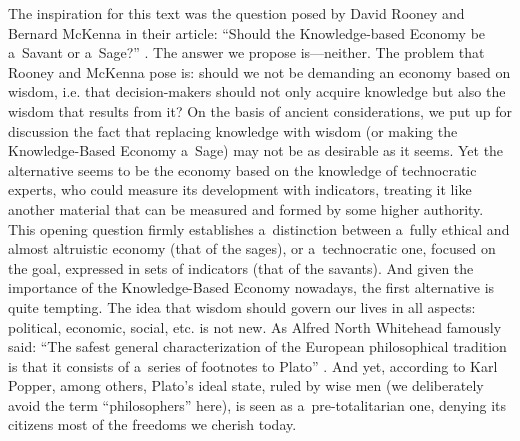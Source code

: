 The inspiration for this text was the question posed by David Rooney and Bernard McKenna in their article: ``Should the Knowledge-based Economy be a~Savant or a~Sage?'' 
\parencite*[][]{}. %
 The answer we propose is---neither. The problem that Rooney and McKenna pose is: should we not be demanding an economy based on wisdom, i.e. that decision-makers should not only acquire knowledge but also the wisdom that results from it? On the basis of ancient considerations, we put up for discussion the fact that replacing knowledge with wisdom (or making the Knowledge-Based Economy a~Sage) may not be as desirable as it seems. Yet the alternative seems to be the economy based on the knowledge of technocratic experts, who could measure its development with indicators, treating it like another material that can be measured and formed by some higher authority. This opening question firmly establishes a~distinction between a~fully ethical and almost altruistic economy (that of the sages), or a~technocratic one, focused on the goal, expressed in sets of indicators (that of the savants). And given the importance of the Knowledge-Based Economy nowadays, the first alternative is quite tempting. The idea that wisdom should govern our lives in all aspects: political, economic, social, etc. is not new. As Alfred North Whitehead famously said: ``The safest general characterization of the European philosophical tradition is that it consists of a~series of footnotes to Plato'' 
\parencite[][p.39]{whitehead_process_2010}. %
 And yet, according to Karl Popper, among others, Plato's ideal state, ruled by wise men (we deliberately avoid the term ``philosophers'' here), is seen as a~pre-totalitarian one, denying its citizens most of the freedoms we cherish today.



